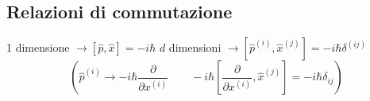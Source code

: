 \subsection{Relazioni di commutazione}
1 dimensione \( \rightarrow [\hat{p}, \hat{x}] = -i\hbar \) \newline
\( d \) dimensioni \( \rightarrow [\hat{p}^{(i)}, \hat{x}^{(j)}] = -i\hbar \delta^{(ij)} \)
\[
\left( \hat{p}^{(i)} \rightarrow -i\hbar \frac{\partial}{\partial x^{(i)}} \qquad -i\hbar\left[ \frac{\partial}{\partial x^{(i)}}, \hat{x}^{(j)} \right] = -i\hbar \delta_{ij} \right)
\]